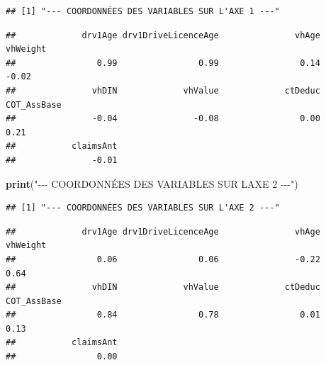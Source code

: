 \documentclass[
]{article}
\newenvironment{Shaded}{\begin{snugshade}}{\end{snugshade}}
\newcommand{\DecValTok}[1]{\textcolor[rgb]{0.00,0.00,0.81}{#1}}
\newcommand{\FunctionTok}[1]{\textcolor[rgb]{0.13,0.29,0.53}{\textbf{#1}}}
\newcommand{\NormalTok}[1]{#1}
\newcommand{\SpecialCharTok}[1]{\textcolor[rgb]{0.81,0.36,0.00}{\textbf{#1}}}
\newcommand{\StringTok}[1]{\textcolor[rgb]{0.31,0.60,0.02}{#1}}
\begin{document}
\begin{verbatim}
## [1] "--- COORDONNÉES DES VARIABLES SUR L'AXE 1 ---"
\end{verbatim}

\begin{Shaded}
\end{Shaded}

\begin{verbatim}
##             drv1Age drv1DriveLicenceAge               vhAge            vhWeight 
##                0.99                0.99                0.14               -0.02 
##               vhDIN             vhValue             ctDeduc         COT_AssBase 
##               -0.04               -0.08                0.00                0.21 
##           claimsAnt 
##               -0.01
\end{verbatim}

\begin{Shaded}
\begin{Highlighting}[]
\FunctionTok{print}\NormalTok{(}\StringTok{"{-}{-}{-} COORDONNÉES DES VARIABLES SUR L\textquotesingle{}AXE 2 {-}{-}{-}"}\NormalTok{)}
\end{Highlighting}
\end{Shaded}

\begin{verbatim}
## [1] "--- COORDONNÉES DES VARIABLES SUR L'AXE 2 ---"
\end{verbatim}

\begin{Shaded}
\end{Shaded}

\begin{verbatim}
##             drv1Age drv1DriveLicenceAge               vhAge            vhWeight 
##                0.06                0.06               -0.22                0.64 
##               vhDIN             vhValue             ctDeduc         COT_AssBase 
##                0.84                0.78                0.01                0.13 
##           claimsAnt 
##                0.00
\end{verbatim}
\end{document}

